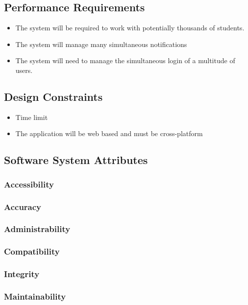 \documentclass[a4paper,12pt]{article}
\begin{document}
        \subsection{Performance Requirements}
        \begin{itemize}
        \item The system will be required to work with potentially thousands of students.
        \item The system will manage many simultaneous notifications
        \item The system will need to manage the simultaneous login of a multitude of users.
        \end{itemize}
        
        \subsection{Design Constraints}
        \begin{itemize}
        \item Time limit
        \item The application will be web based and must be cross-platform
        \end{itemize}
        
        \subsection{Software System Attributes}
        	\subsubsection{Accessibility}
        	
        	\subsubsection{Accuracy}
        	\subsubsection{Administrability}
        	\subsubsection{Compatibility}
        	\subsubsection{Integrity}
        	\subsubsection{Maintainability}
\end{document}
